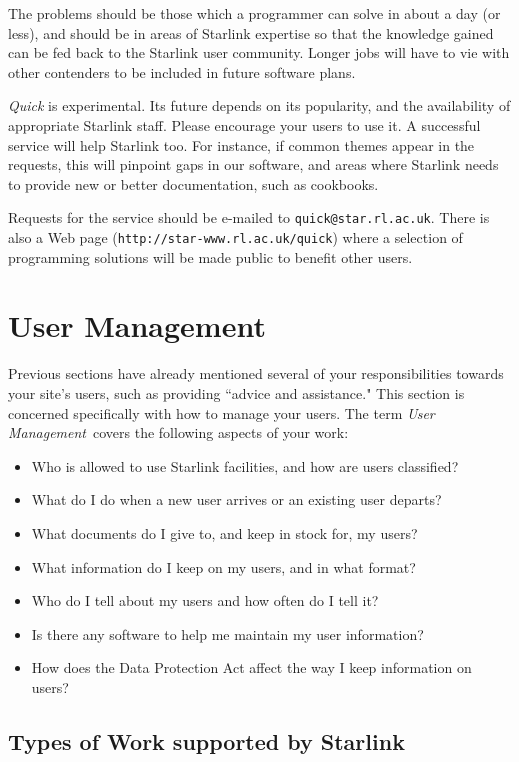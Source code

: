 The problems should be those which a programmer can solve in about
a day (or less), and should be in areas of Starlink expertise so that the
knowledge gained can be fed back to the Starlink user community.
Longer jobs will have to vie with other contenders to be included in future
software plans.

{\em Quick}\/ is experimental.
Its future depends on its popularity, and the availability of appropriate
Starlink staff. 
Please encourage your users to use it.
A successful service will help Starlink too.
For instance, if common themes appear in the requests, this will pinpoint
gaps in our software, and areas where Starlink needs to provide new or better
documentation, such as cookbooks.

Requests for the service should be e-mailed to {\tt quick@star.rl.ac.uk}.
There is also a Web page ({\tt http://star-www.rl.ac.uk/quick}) where a
selection of programming solutions will be made public to benefit
other users.

\newpage

\section {\label{usermanagement}User Management}

Previous sections have already mentioned several of your responsibilities
towards your site's users, such as providing ``advice and assistance."
This section is concerned specifically with how to manage your users.
The term {\em User Management}\, covers the following aspects of your work:
\begin{itemize}
\item Who is allowed to use Starlink facilities, and how are users
      classified?
\item What do I do when a new user arrives or an existing user departs?
\item What documents do I give to, and keep in stock for, my users?
\item What information do I keep on my users, and in what format?
\item Who do I tell about my users and how often do I tell it?
\item Is there any software to help me maintain my user information?
\item How does the Data Protection Act affect the way I keep information on
      users?
\end{itemize}

\subsection{\label{worktype}Types of Work supported by Starlink}

